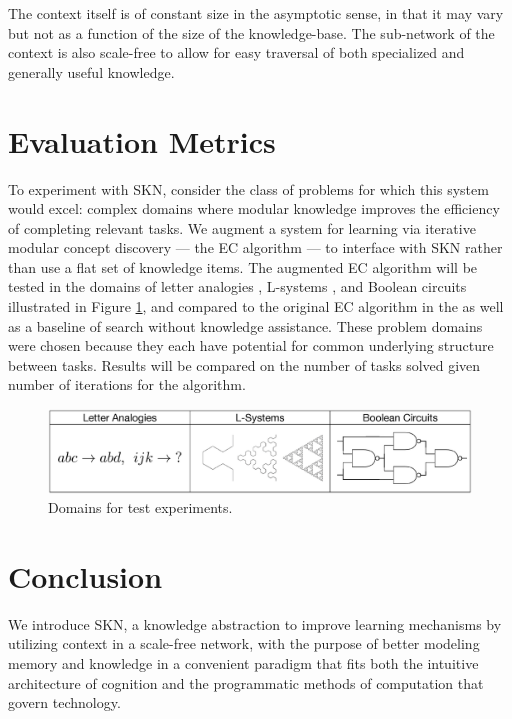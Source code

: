 \documentclass[11pt,letterpaper]{article}
\begin{document}
The context itself is of constant size in the asymptotic sense, in that it
may vary but not as a function of the size of the knowledge-base. The
sub-network of the context is also scale-free to allow for easy traversal of
both specialized and generally useful knowledge.


\section{Evaluation Metrics}

To experiment with SKN, consider the class of problems for which this system
would excel: complex domains where modular knowledge improves the efficiency
of completing relevant tasks. We augment a system for learning via iterative
modular concept discovery --- the EC algorithm \cite{dechter13} --- to
interface with SKN rather than use a flat set of knowledge items. The
augmented EC algorithm will be tested in the domains of letter analogies
\cite{hofstadter94}, L-systems \cite{rozenberg80}, and Boolean circuits
illustrated in Figure \ref{fig:exps}, and compared to the original EC algorithm in the as
well as a baseline of search without knowledge assistance. These problem
domains were chosen because they each have potential for common underlying
structure between tasks. Results will be compared on the number of tasks
solved given number of iterations for the algorithm.

\begin{figure}[h]
\centering
\includegraphics[scale=.5]{exps.eps}
\caption{Domains for test experiments.}
\label{fig:exps}
\end{figure}


\section{Conclusion}

We introduce SKN, a knowledge abstraction to improve learning mechanisms by
utilizing context in a scale-free network, with the purpose of better
modeling memory and knowledge in a convenient paradigm that fits both the
intuitive architecture of cognition and the programmatic methods of
computation that govern technology.
\end{document}
